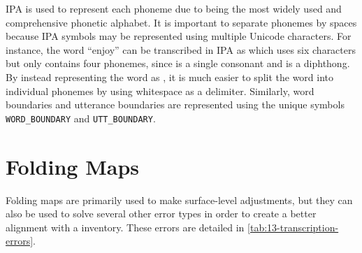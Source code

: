 IPA is used to represent each phoneme due to being the most widely used and comprehensive phonetic alphabet. It is important to separate phonemes by spaces because IPA symbols may be represented using multiple Unicode characters. For instance, the word ``enjoy'' can be transcribed in IPA as  which uses six characters but only contains four phonemes, since  is a single consonant and  is a diphthong. By instead representing the word as , it is much easier to split the word into individual phonemes by using whitespace as a delimiter. Similarly, word boundaries and utterance boundaries are represented using the unique symbols \texttt{WORD\_BOUNDARY} and \texttt{UTT\_BOUNDARY}. 

\section{Folding Maps}\label{sec:13-folding-details}

Folding maps are primarily used to make surface-level adjustments, but they can also be used to solve several other error types in order to create a better alignment with a \phoible inventory. These errors are detailed in \cref{tab:13-transcription-errors}.

